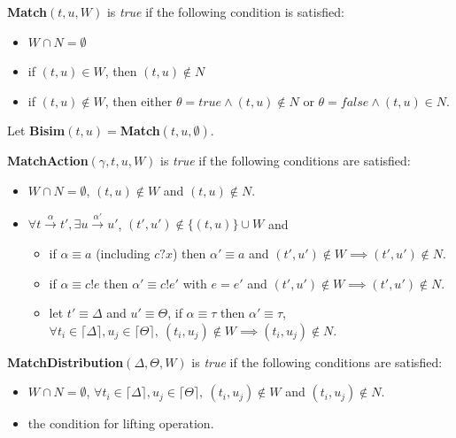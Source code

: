\documentclass[runningheads]{llncs}
\begin{document}
\begin{definition}\label{def:match}
\textbf{Match}$(t,u,W)$ is \textit{true} if the following condition is satisfied:
\begin{itemize}
    \item $W\cap N=\emptyset$
    \item if $(t,u)\in W$, then $(t,u)\notin N$
    \item if $(t,u)\notin W$, then either $\theta=true\wedge(t,u)\notin N$ or $\theta=false\wedge(t,u)\in N$.
\end{itemize}
Let \textbf{Bisim}$(t,u)=$\textbf{Match}$(t,u,\emptyset)$.
\end{definition}
\begin{definition}\label{def:matchaction}
\textbf{MatchAction}$(\gamma,t,u,W)$ is \textit{true} if the following conditions are satisfied:
\begin{itemize}
    \item $W\cap N=\emptyset$, $(t,u)\notin W$ and $(t,u)\notin N$.
    \item $\forall t\xrightarrow{\alpha}t', \exists u\xrightarrow{\alpha'}u'$, $(t',u')\notin \{(t,u)\}\cup W$ and 
    \begin{itemize}
        \item if $\alpha\equiv a$ (including $c?x$) then $\alpha'\equiv a$ and $(t',u')\notin W\implies(t',u')\notin N$.
        \item if $\alpha\equiv c!e$ then $\alpha'\equiv c!e'$ with $e=e'$ and $(t',u')\notin W\implies(t',u')\notin N$.
        \item let $t'\equiv \Delta$ and $u'\equiv \Theta$, if $\alpha\equiv \tau$ then $\alpha'\equiv \tau$, $\forall t_i\in \lceil\Delta\rceil, u_j\in \lceil\Theta\rceil,\ (t_i,u_j)\notin W\implies (t_i,u_j)\notin N$.
    \end{itemize}
\end{itemize}
\end{definition}
\begin{definition}\label{def:matchdistribution}
\textbf{MatchDistribution}$(\Delta,\Theta,W)$ is \textit{true} if the following conditions are satisfied:
\begin{itemize}
    \item $W\cap N=\emptyset$, $\forall t_i\in \lceil\Delta\rceil, u_j\in \lceil\Theta\rceil,\ (t_i,u_j)\notin W$ and $(t_i,u_j)\notin N$.
    \item the condition for lifting operation.
\end{itemize}
\end{definition}
\end{document}
